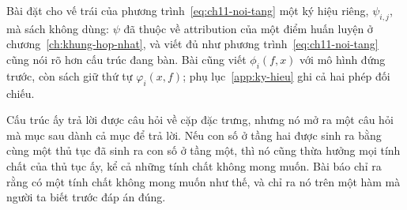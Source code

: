 Bài đặt cho vế trái của phương trình~\ref{eq:ch11-noi-tang} một ký hiệu riêng,
$\psi_{i,j}$, mà sách không dùng: $\psi$ đã thuộc về attribution của một điểm
huấn luyện ở chương~\ref{ch:khung-hop-nhat}, và viết đủ như phương
trình~\ref{eq:ch11-noi-tang} cũng nói rõ hơn cấu trúc đang bàn. Bài cũng viết
$\phi_i(f,x)$ với mô hình đứng trước, còn sách giữ thứ tự $\varphi_i(x,f)$;
phụ lục~\ref{app:ky-hieu} ghi cả hai phép đối chiếu.

Cấu trúc ấy trả lời được câu hỏi về cặp đặc trưng, nhưng nó mở ra một câu hỏi
mà mục sau dành cả mục để trả lời. Nếu con số ở tầng hai được sinh ra bằng cùng
một thủ tục đã sinh ra con số ở tầng một, thì nó cũng thừa hưởng mọi tính chất
của thủ tục ấy, kể cả những tính chất không mong muốn. Bài báo chỉ ra rằng có
một tính chất không mong muốn như thế, và chỉ ra nó trên một hàm mà người ta
biết trước đáp án đúng.
%
